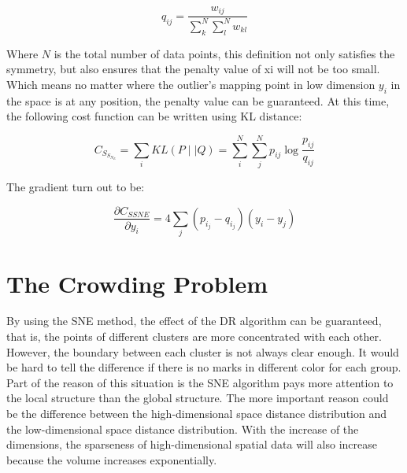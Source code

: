 \begin{equation*}
    {q_{i j}} = \frac {w_{i j}} {\sum_k^N \sum_l^N w_{k l}}
\end{equation*}

\noindent Where $N$ is the total number of data points, this definition not only satisfies the symmetry, but also ensures that the penalty value of xi will not be too small. Which means no matter where the outlier's mapping point in low dimension $y_i$ in the space is at any position, the penalty value can be guaranteed. At this time, the following cost function can be written using KL distance:

\begin{equation*}
    {C_S_S_N_E} = {\sum_i KL(P \mid \mid Q)} =  { {\sum_i^N} {\sum_j^N} {p_{i j}} \log \frac{p_{i j}}{q_{i j}} }
\end{equation*}

\noindent The gradient turn out to be: 

\begin{equation*}
\frac{\partial C_{SSNE}}{\partial y_i} = 4\sum_j(p_i_j - q_i_j)(y_i - y_j)
\end{equation*}




\section{The Crowding Problem}

By using the SNE method, the effect of the DR algorithm can be guaranteed, that is, the points of different clusters are more concentrated with each other. However, the boundary between each cluster is not always clear enough. It would be hard to tell the difference if there is no marks in different color for each group.\\  

\noindent Part of the reason of this situation is the SNE algorithm pays more attention to the local structure than the global structure. The more important reason could be the difference between the high-dimensional space distance distribution and the low-dimensional space distance distribution. With the increase of the dimensions, the sparseness of high-dimensional spatial data will also increase because the volume increases exponentially.\\

